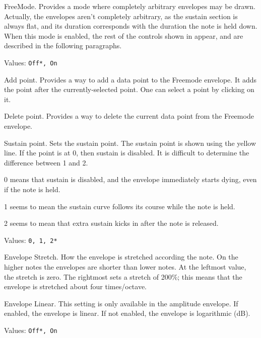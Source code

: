    FreeMode.  Provides a mode where completely arbitrary envelopes may be
   drawn.
   Actually, the envelopes aren't completely arbitrary, as the sustain
   section is always flat, and its duration corresponds with the duration
   the note is held down.
   When this mode is enabled, the rest of the controls shown in
   appear, and are described in the following paragraphs.

   Values: \texttt{Off*, On}

   Add point.
   Provides a way to add a data point to the Freemode envelope.
   It adds the point after the currently-selected point. One can select a
   point by clicking on it.

   Delete point.
   Provides a way to delete the current data point from the Freemode envelope.

   Sustain point.
   Sets the sustain point.
   The sustain point is shown using the yellow line.
   If the point is at 0, then sustain is disabled.
   It is difficult to determine the difference between 1 and 2.

   \begin{enumber}
      \item{0} means that sustain is disabled, and the envelope immediately
      starts dying, even if the note is held.
      \item{1} seems to mean the sustain curve follows its course while the
      note is held.
      \item{2} seems to mean that extra sustain kicks in after the note is
      released.
   \end{enumber}

   Values: \texttt{0, 1, 2*}

   Envelope Stretch.
   How the envelope is stretched according the note. On the higher notes the
   envelopes are shorter than lower notes. At the leftmost value, the
   stretch is zero. The rightmost sets a stretch of 200\%; this means that the
   envelope is stretched about four times/octave.

   Envelope Linear.
   This setting is only available in the amplitude envelope.
   If enabled, the envelope is linear.
   If not enabled, the envelope is logarithmic (dB).

   Values: \texttt{Off*, On}

